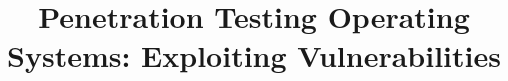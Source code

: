 \documentclass[manuscript,acmsmall,anonymous,review,screen,nonacm=true, authorversion=true]{acmart}
\begin{document}
\newcommand{\wq}[1]{{\color{blue}#1}}

\title{Penetration Testing Operating Systems: Exploiting Vulnerabilities}








\end{document}
